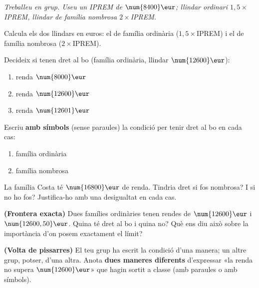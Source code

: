 \noindent\textit{Treballeu en grup. Useu un IPREM de $\num{8400}\eur$; llindar
ordinari $1,5\times$IPREM, llindar de família nombrosa $2\times$IPREM.}

\begin{exercicis}
\begin{exlist}
  \item Calcula els dos llindars en euros: el de família ordinària ($1,5\times$IPREM)
        i el de família nombrosa ($2\times$IPREM).
  \item Decideix si tenen dret al bo (família ordinària, llindar $\num{12600}\eur$):
        \begin{enumerate}[label=\alph*), leftmargin=1.6em, topsep=2pt]
          \item renda $\num{8000}\eur$ \hfill \item renda $\num{12600}\eur$ \hfill
          \item renda $\num{12601}\eur$
        \end{enumerate}
  \item Escriu \textbf{amb símbols} (sense paraules) la condició per tenir dret al bo
        en cada cas:
        \begin{enumerate}[label=\alph*), leftmargin=1.6em, topsep=2pt]
          \item família ordinària
          \item família nombrosa
        \end{enumerate}
  \item La família Costa té $\num{16800}\eur$ de renda. Tindria dret si fos nombrosa?
        I si no ho fos? Justifica-ho amb una desigualtat en cada cas.
  \item \textbf{(Frontera exacta)} Dues famílies ordinàries tenen rendes de
        $\num{12600}\eur$ i $\num{12600,50}\eur$. Quina té dret al bo i quina no? Què
        ens diu això sobre la importància d'on posem exactament el límit?
  \item \textbf{(Volta de pissarres)} El teu grup ha escrit la condició d'una manera;
        un altre grup, potser, d'una altra. Anota \textbf{dues maneres diferents}
        d'expressar «la renda no supera $\num{12600}\eur$» que hagin sortit a classe
        (amb paraules o amb símbols).
\end{exlist}
\end{exercicis}

